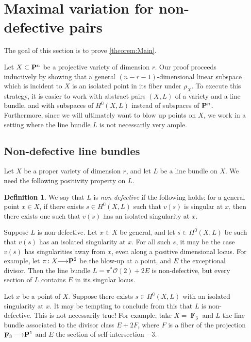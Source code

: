 \documentclass[11pt,reqno]{amsart}
\theoremstyle{plain}
\theoremstyle{definition}
\newtheorem{definition}[theorem]{Definition}
\theoremstyle{remark}
\numberwithin{equation}{section}
\DeclareMathOperator{\F}{\mathbf F}
\renewcommand{\to}{{\longrightarrow}}
\numberwithin{equation}{section}
\renewcommand{\O}{\mathcal O}
\begin{document}
\section{Maximal variation for non-defective pairs}
\label{sec:proof_of_theorem:main}
The goal of this section is to prove \autoref{theorem:Main}.

Let $X \subset \P^n$ be a projective variety of dimension $r$.
Our proof proceeds inductively by showing that a general $(n-r-1)$-dimensional linear subspace which is incident to $X$ is an isolated point in its fiber under $\rho_X$.
To execute this strategy, it is easier to work with abstract pairs $(X, L)$ of a variety and a line bundle, and with subspaces of $H^0(X, L)$ instead of subspaces of $\P^n$.
Furthermore, since we will ultimately want to blow up points on $X$, we work in a setting where the line bundle $L$ is not necessarily very ample.

\subsection{Non-defective line bundles}
Let $X$ be a proper variety of dimension $r$, and let $L$ be a line bundle on $X$.
We need the following positivity property on $L$.
\begin{definition}
  \label{definition:Genericallynon-defective} 
  We say that $L$ is \emph{non-defective} if the following holds: for a general point $x \in X$, if there exists $s \in H^0(X, L)$ such that $v(s)$ is singular at $x$, then there exists one such that $v(s)$ has an isolated singularity at $x$.
\end{definition}
\begin{remark}
  Suppose $L$ is non-defective.
  Let $x \in X$ be general, and let $s \in H^0(X, L)$ be such that $v(s)$ has an isolated singularity at $x$.
  For all such $s$, it may be the case $v(s)$ has singularities away from $x$, even along a positive dimensional locus.
  For example, let $\pi \from X \to \P^2$  be the blow-up at a point, and $E$ the exceptional divisor.
  Then the line bundle $L = \pi^*\O(2) + 2E$ is non-defective, but every section of $L$ contains $E$ in its singular locus.
\end{remark}
\begin{remark}
  Let $x$ be a point of $X$.
  Suppose there exists $s \in H^0(X, L)$ with an isolated singularity at $x$.
  It may be tempting to conclude from this that $L$ is non-defective.
  This is not necessarily true!
  For example, take $X = \F_3$ and $L$ the line bundle associated to the divisor class $E + 2F$, where $F$ is a fiber of the projection $\F_3 \to \P^1$ and $E$ the section of self-intersection $-3$.
\end{remark}
\end{document}
